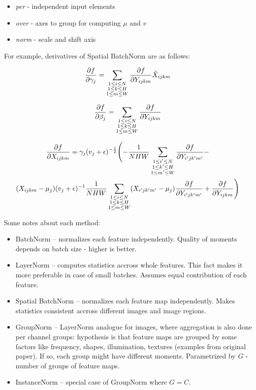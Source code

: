 \documentclass[12pt]{article}
\begin{document}
\begin{itemize}
\item \textit{per} - independent input elements
\item \textit{over} - axes to group for computing $\mu$ and $v$
\item \textit{norm} - scale and shift axis
\end{itemize}

For example, derivatives of Spatial BatchNorm are as follows:

\[
	\pdv{f}{\gamma_j} = 
	\sum_{
		\substack{
			1 \le i \le N \\ 
			1 \le k \le H \\ 
			1 \le m \le W
		}
	} \pdv{f}{Y_{ijkm}} \hat{X}_{ijkm}
\]

\[
	\pdv{f}{\beta_j} = 
	\sum_{
		\substack{
			1 \le i \le N \\ 
			1 \le k \le H \\ 
			1 \le m \le W
		}
	} \pdv{f}{Y_{ijkm}}
\]

\begin{gather*}
\pdv{f}{X_{ijkm}} =
	\gamma_j (v_j + \epsilon)^{-\frac{1}{2}} 
	\Biggl(	
		- \frac{1}{NHW} \sum_{
			\substack{
				1 \le i' \le N \\ 
				1 \le k' \le H \\ 
				1 \le m' \le W
			}
		} \pdv{f}{Y_{i'jk'm'}} - \\
		(X_{ijkm} - \mu_j) (v_j + \epsilon)^{-1} 
		\frac{1}{NHW} \sum_{
			\substack{
				1 \le i \le N \\ 
				1 \le k \le H \\ 
				1 \le m \le W
			}
		} (X_{i'jk'm'} - \mu_j) \pdv{f}{Y_{i'jk'm'}} 
		+ \pdv{f}{Y_{ijkm}}
	\Biggr)
\end{gather*}

\newpage

Some notes about each method:

\begin{itemize}
\item BatchNorm -- normalizes each feature independently. Quality of moments depends on batch size - higher is better.
\item LayerNorm -- computes statistics accross whole features. This fact makes it more preferable in case of small batches. Assumes equal contribution of each feature.
\item Spatial BatchNorm -- normalizes each feature map independently. Makes statistics consistent accross different images and image regions.
\item GroupNorm -- LayerNorm analogue for images, where aggregation is also done per channel groups: hypothesis is that feature maps are grouped by some factors like frequency, shapes, illumination, textures (examples from original paper). If so, each group might have different moments. Parametrized by $G$ - number of groups of feature maps.
\item InstanceNorm -- special case of GroupNorm where $G = C$.
\end{itemize}
\end{document}
